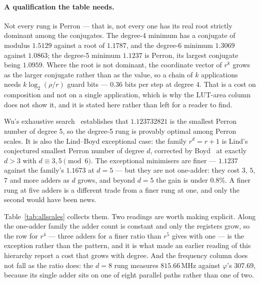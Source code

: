 \paragraph{A qualification the table needs.} Not every rung is Perron --- that
is, not every one has its real root strictly dominant among the conjugates. The
degree-4 minimum has a conjugate of modulus $1.5129$ against a root of
$1.1787$, and the degree-6 minimum $1.3069$ against $1.0863$; the degree-5
minimum $1.1237$ is Perron, its largest conjugate being $1.0959$. Where the
root is not dominant, the coordinate vector of $r^{k}$ grows as the larger
conjugate rather than as the value, so a chain of $k$ applications needs
$k\log_2(\rho/r)$ guard bits --- $0.36$ bits per step at degree 4. That is a cost
on composition and not on a single application, which is why the LUT-area column
does not show it, and it is stated here rather than left for a reader to find.

Wu's exhaustive search~\cite{wu2010} establishes that $1.123732821$ is the
smallest Perron number of degree 5, so the degree-5 rung is provably optimal
among Perron scales. It is also the Lind--Boyd exceptional case: the family
$r^d=r+1$ is Lind's conjectured smallest Perron number of degree $d$, corrected
by Boyd~\cite{boyd1985} at exactly $d>3$ with $d\equiv3,5 \pmod 6$. The
exceptional minimisers are finer --- $1.1237$ against the family's $1.1673$ at
$d=5$ --- but they are not one-adder: they cost $3$, $5$, $7$ and more adders as
$d$ grows, and beyond $d=5$ the gain is under $0.8\%$. A finer rung at five
adders is a different trade from a finer rung at one, and only the second would
have been news.

Table~\ref{tab:allscales} collects them. Two readings are worth making
explicit. Along the one-adder family the adder count is constant and only the
registers grow, so the row for $r^4$ --- three adders for a finer ratio than
$r^5$ gives with one --- is the exception rather than the pattern, and it is what
made an earlier reading of this hierarchy report a cost that grows with degree.
And the frequency column does not fall as the ratio does: the $d=8$ rung
measures $815.66$\,MHz against $\varphi$'s $307.69$, because its single adder
sits on one of eight parallel paths rather than one of two.

